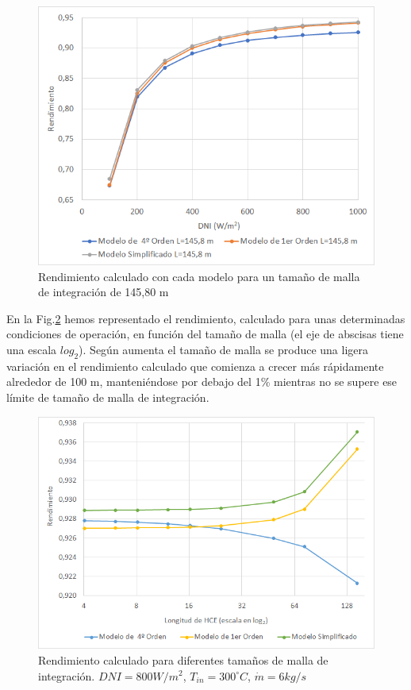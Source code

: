 \begin{figure}[H]
\includegraphics[width=0.9\linewidth]{images/malla14580.png}
\caption{Rendimiento calculado con cada modelo para un tamaño de malla de integración de 145,80 m} 
\label{fig:malla14580}
\end{figure}

En la Fig.\ref{fig:malla_variable_DNI_800} hemos representado el rendimiento, calculado para unas determinadas condiciones de operación, en función del tamaño de malla (el eje de abscisas tiene una escala $log_2$). Según aumenta el tamaño de malla se produce una ligera variación en el rendimiento calculado que comienza a crecer más rápidamente alrededor de 100 m, manteniéndose por debajo del 1\% mientras no se supere ese límite de tamaño de malla de integración. 

\begin{figure}[H]
\includegraphics[width=0.9\linewidth]{images/malla_variable_DNI_800.png}
\caption[Rendimiento calculado para diferentes tamaños de malla de integración]{Rendimiento calculado para diferentes tamaños de malla de integración. $DNI=800 W/m^2$, $T_{in}=300 ^\circ C$, $\dot m = 6 kg/s$} 
\label{fig:malla_variable_DNI_800}
\end{figure}

